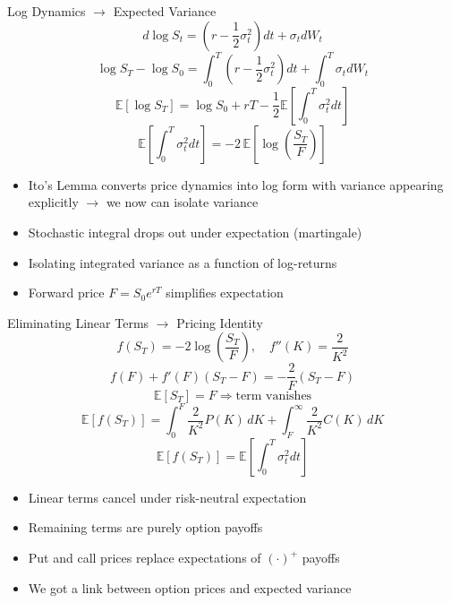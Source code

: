 \documentclass{beamer}
\begin{document}

\begin{frame}{Log Dynamics $\rightarrow$ Expected Variance}
\[
d\log S_t = \left(r - \frac{1}{2}\sigma_t^2\right) dt + \sigma_t dW_t
\]
\[
\log S_T - \log S_0
= \int_0^T \left(r - \frac{1}{2}\sigma_t^2\right) dt
+ \int_0^T \sigma_t dW_t
\]
\[
\mathbb{E}[\log S_T]
= \log S_0 + rT - \frac{1}{2}\mathbb{E}\left[\int_0^T \sigma_t^2 dt\right]
\]
\[
\mathbb{E}\left[\int_0^T \sigma_t^2 dt\right]
= -2\,\mathbb{E}\left[\log\left(\frac{S_T}{F}\right)\right]
\]

\begin{itemize}
\item Ito's Lemma converts price dynamics into log form with variance appearing explicitly $\rightarrow$ we now can isolate variance
\item Stochastic integral drops out under expectation (martingale)
\item Isolating integrated variance as a function of log-returns
\item Forward price $F = S_0 e^{rT}$ simplifies expectation
\end{itemize}
\end{frame}


\begin{frame}{Eliminating Linear Terms $\rightarrow$ Pricing Identity}
\[
f(S_T) = -2 \log\left(\frac{S_T}{F}\right), \quad f''(K) = \frac{2}{K^2}
\]
\[
f(F) + f'(F)(S_T - F) = -\frac{2}{F}(S_T - F)
\]
\[
\mathbb{E}[S_T] = F \Rightarrow \text{term vanishes}
\]
\[
\mathbb{E}[f(S_T)]
=
\int_0^F \frac{2}{K^2} P(K)\, dK
+ \int_F^\infty \frac{2}{K^2} C(K)\, dK
\]
\[
\mathbb{E}[f(S_T)] = \mathbb{E}\left[\int_0^T \sigma_t^2 dt\right]
\]

\begin{itemize}
\item Linear terms cancel under risk-neutral expectation
\item Remaining terms are purely option payoffs 
\item Put and call prices replace expectations of $(\cdot)^+$ payoffs
\item We got a link between option prices and expected variance
\end{itemize}
\end{frame}

\end{document}
